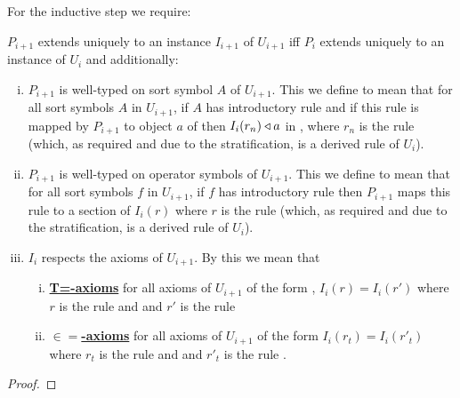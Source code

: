 For the inductive step we require:
\begin{lemmastar}
\item $P_{i+1}$ extends uniquely to an instance $I_{i+1}$ of $U_{i+1}$ iff  $P_i$ extends uniquely to an instance of $U_{i}$ and additionally:
\begin{enumerate}[(i)]
\item
$P_{i+1}$ is well-typed on sort symbol $A$ of $U_{i+1}$. This we define to mean that
for all sort symbols $A$ in $U_{i+1}$, if $A$ has introductory rule 
\genericAintroductoryrule and if this rule is mapped by $P_{i+1}$
to object $a$ of \catcw then $I_i(r_n) \triangleleft a$ in \catc, where $r_n$ is the rule 
 (which, as required and due to the stratification, is a derived rule of $U_i$).
\item  $P_{i+1}$ is well-typed on operator symbols  of $U_{i+1}$. This we define to mean that
for all sort symbols $f$ in $U_{i+1}$, if $f$ has introductory rule 
\genericfintroductoryrule then $P_{i+1}$ maps this rule to a section 
of $I_i(r)$ where $r$ is the rule
 (which, as required and due to the stratification, is a derived rule of $U_i$). 
\item
 $I_i$ respects the axioms of $U_{i+1}$. By this we mean that 
\begin{enumerate}[(i)]
\item \underline{\textbf{T=-axioms}} 
for all axioms of $U_{i+1}$ of the form
 ,
$I_i(r) = I_i(r')$ where $r$ is the rule
 and  
and $r'$ is the rule 
\item \underline{\textbf{$\boldsymbol{\in=}$-axioms}} 
for all axioms of $U_{i+1}$ of the form
$I_i(r_t) = I_i(r'_t)$ where $r_t$ is the rule
 and  
and $r'_t$ is the rule .
\end{enumerate}
\end{enumerate}
\end{lemmastar}
\begin{proof} 
\tbd
\end{proof}

